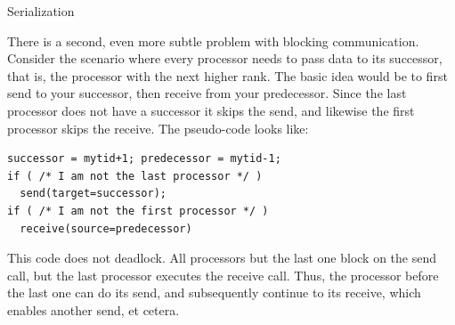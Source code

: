 
 {Serialization}
\label{sec:serialization}

There is a second, even more subtle problem with blocking
communication. Consider the scenario where every processor needs to
pass data to its successor, that is, the processor with the next
higher rank. The basic idea would be to first send to your successor,
then receive from your predecessor. Since the last processor does not
have a successor it skips the send, and likewise the first processor
skips the receive. The pseudo-code looks like:
\begin{lstlisting}
successor = mytid+1; predecessor = mytid-1;
if ( /* I am not the last processor */ )
  send(target=successor);
if ( /* I am not the first processor */ )
  receive(source=predecessor)
\end{lstlisting}
This code does not deadlock. All processors but the last one block on
the send call, but the last processor executes the receive call. Thus,
the processor before the last one can do its send, and subsequently
continue to its receive, which enables another send, et cetera.

